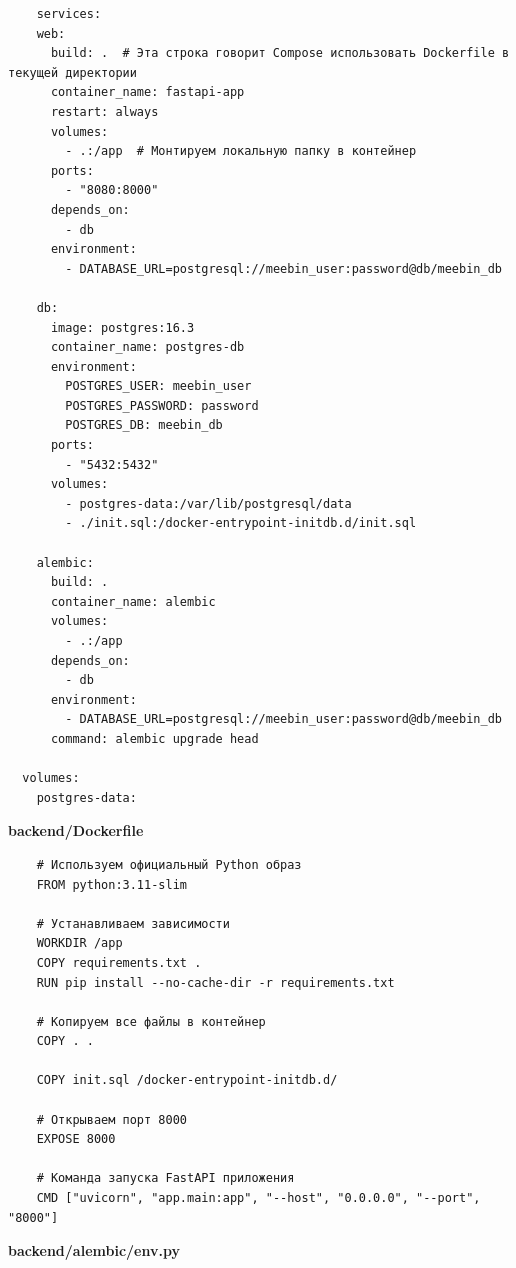 \documentclass[coursework]{SCWorks}
\begin{document}
\begin{verbatim}
    services:
    web:
      build: .  # Эта строка говорит Compose использовать Dockerfile в текущей директории
      container_name: fastapi-app
      restart: always
      volumes:
        - .:/app  # Монтируем локальную папку в контейнер
      ports:
        - "8080:8000"
      depends_on:
        - db
      environment:
        - DATABASE_URL=postgresql://meebin_user:password@db/meebin_db
  
    db:
      image: postgres:16.3
      container_name: postgres-db
      environment:
        POSTGRES_USER: meebin_user
        POSTGRES_PASSWORD: password
        POSTGRES_DB: meebin_db
      ports:
        - "5432:5432"
      volumes:
        - postgres-data:/var/lib/postgresql/data
        - ./init.sql:/docker-entrypoint-initdb.d/init.sql
  
    alembic:
      build: .
      container_name: alembic
      volumes:
        - .:/app
      depends_on:
        - db
      environment:
        - DATABASE_URL=postgresql://meebin_user:password@db/meebin_db
      command: alembic upgrade head
  
  volumes:
    postgres-data:  
\end{verbatim}

\begin{center}
\textbf{backend/Dockerfile}
\end{center}

\begin{verbatim}
    # Используем официальный Python образ
    FROM python:3.11-slim
    
    # Устанавливаем зависимости
    WORKDIR /app
    COPY requirements.txt .
    RUN pip install --no-cache-dir -r requirements.txt
    
    # Копируем все файлы в контейнер
    COPY . .
    
    COPY init.sql /docker-entrypoint-initdb.d/
    
    # Открываем порт 8000
    EXPOSE 8000
    
    # Команда запуска FastAPI приложения
    CMD ["uvicorn", "app.main:app", "--host", "0.0.0.0", "--port", "8000"]
\end{verbatim}

\begin{center}
\textbf{backend/alembic/env.py}
\end{center}
\end{document}
